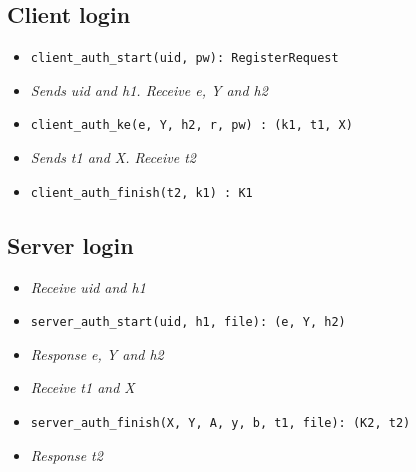 \documentclass[../report.tex]{subfiles}
\begin{document}
\subsection{Client login}
\begin{itemize}
 \item \verb|client_auth_start(uid, pw): RegisterRequest| %
 \item \emph{Sends uid and h1. Receive e, Y and h2}
 \item \verb|client_auth_ke(e, Y, h2, r, pw) : (k1, t1, X)|
 \item \emph{Sends t1 and X. Receive t2}
 \item \verb|client_auth_finish(t2, k1) : K1|

\end{itemize}


\subsection{Server login}
\begin{itemize}
 \item \emph{Receive uid and h1}
 \item \verb|server_auth_start(uid, h1, file): (e, Y, h2)|
 \item \emph{Response e, Y and h2}
 \item \emph{Receive t1 and X}
 \item \verb|server_auth_finish(X, Y, A, y, b, t1, file): (K2, t2)|
 \item \emph{Response t2}

\end{itemize}
\end{document}
